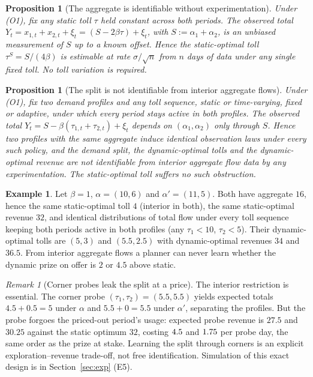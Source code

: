 \documentclass[11pt]{article}
\newtheorem{proposition}[theorem]{Proposition}
\theoremstyle{definition}
\newtheorem{example}[theorem]{Example}
\theoremstyle{remark}
\newtheorem{remark}[theorem]{Remark}
\begin{document}
\begin{proposition}[The aggregate is identifiable without experimentation]\label{prop:ident-static}
Under (O1), fix any static toll $\tau$ held constant across both periods. The observed total $Y_t=x_{1,t}+x_{2,t}+\xi_t=(S-2\beta\tau)+\xi_t$, with $S:=\alpha_1+\alpha_2$, is an unbiased measurement of $S$ up to a known offset. Hence the static-optimal toll $\tau^S=S/(4\beta)$ is estimable at rate $\sigma/\sqrt n$ from $n$ days of data under any single fixed toll. No toll variation is required.
\end{proposition}

\begin{proposition}[The split is not identifiable from interior aggregate flows]\label{prop:ident-split}
Under (O1), fix two demand profiles and any toll sequence, static or time-varying, fixed or adaptive, under which every period stays active in both profiles. The observed total $Y_t=S-\beta(\tau_{1,t}+\tau_{2,t})+\xi_t$ depends on $(\alpha_1,\alpha_2)$ only through $S$. Hence two profiles with the same aggregate induce identical observation laws under every such policy, and the demand split, the dynamic-optimal tolls and the dynamic-optimal revenue are not identifiable from interior aggregate flow data by any experimentation. The static-optimal toll suffers no such obstruction.
\end{proposition}

\begin{example}\label{ex:ident}
Let $\beta=1$, $\alpha=(10,6)$ and $\alpha'=(11,5)$. Both have aggregate $16$, hence the same static-optimal toll $4$ (interior in both), the same static-optimal revenue $32$, and identical distributions of total flow under every toll sequence keeping both periods active in both profiles (any $\tau_1<10$, $\tau_2<5$). Their dynamic-optimal tolls are $(5,3)$ and $(5.5,2.5)$ with dynamic-optimal revenues $34$ and $36.5$. From interior aggregate flows a planner can never learn whether the dynamic prize on offer is $2$ or $4.5$ above static.
\end{example}

\begin{remark}[Corner probes leak the split at a price]\label{rem:corner-probe}
The interior restriction is essential. The corner probe $(\tau_1,\tau_2)=(5.5,5.5)$ yields expected totals $4.5+0.5=5$ under $\alpha$ and $5.5+0=5.5$ under $\alpha'$, separating the profiles. But the probe forgoes the priced-out period's usage: expected probe revenue is $27.5$ and $30.25$ against the static optimum $32$, costing $4.5$ and $1.75$ per probe day, the same order as the prize at stake. Learning the split through corners is an explicit exploration--revenue trade-off, not free identification. Simulation of this exact design is in Section~\ref{sec:exp} (E5).
\end{remark}
\end{document}
